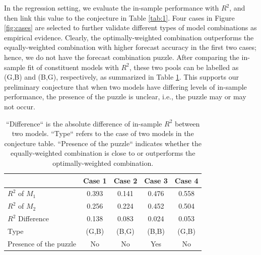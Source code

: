 \documentclass{monashthesis}
\begin{document}
In the regression setting, we evaluate the in-sample performance with \(R^2\), and then link this value to the conjecture in Table \ref{tab:1}. Four cases in Figure \ref{fig:cases} are selected to further validate different types of model combinations as empirical evidence. Clearly, the optimally-weighted combination outperforms the equally-weighted combination with higher forecast accuracy in the first two cases; hence, we do not have the forecast combination puzzle. After comparing the in-sample fit of constituent models with \(R^2\), these two pools can be labelled as (G,B) and (B,G), respectively, as summarized in Table \ref{tab:cases}. This supports our preliminary conjecture that when two models have differing levels of in-sample performance, the presence of the puzzle is unclear, i.e., the puzzle may or may not occur.

\begin{table}[ht]
  \centering
    \begin{tabular}{l|cccc}
    \toprule
                              &    Case 1    &    Case 2   &    Case 3    &    Case 4   \\  
    \midrule
    $R^2$ of $M_1$            &    0.393     &    0.141    &    0.476     &    0.558    \\
    $R^2$ of $M_2$            &    0.256     &    0.224    &    0.452     &    0.504    \\
    $R^2$ Difference          &    0.138     &    0.083    &    0.024     &    0.053    \\
    Type                      &    (G,B)     &    (B,G)    &    (B,B)     &    (G,B)    \\
    Presence of the puzzle    &     No       &     No      &     Yes      &     No     \\
    \bottomrule
    \end{tabular}
    \caption{``Difference`` is the absolute difference of in-sample $R^2$ between two models. ``Type`` refers to the case of two models in the conjecture table. ``Presence of the puzzle`` indicates whether the equally-weighted combination is close to or outperforms the optimally-weighted combination.}
  \label{tab:cases}
\end{table}
\end{document}

